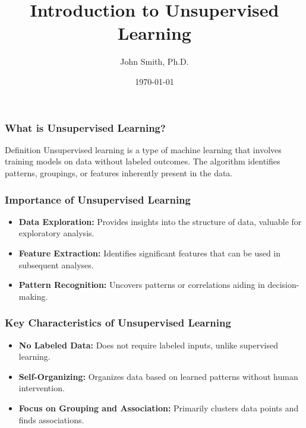 \documentclass[aspectratio=169]{beamer}
\begin{document}
\frame{\titlepage}

\begin{frame}[fragile]
    \title{Introduction to Unsupervised Learning}
    \author{John Smith, Ph.D.}
    \date{\today}
    \maketitle
\end{frame}

\begin{frame}[fragile]
    \frametitle{What is Unsupervised Learning?}
    \begin{block}{Definition}
        Unsupervised learning is a type of machine learning that involves training models on data without labeled outcomes. The algorithm identifies patterns, groupings, or features inherently present in the data.
    \end{block}
\end{frame}

\begin{frame}[fragile]
    \frametitle{Importance of Unsupervised Learning}
    \begin{itemize}
        \item \textbf{Data Exploration:} Provides insights into the structure of data, valuable for exploratory analysis.
        \item \textbf{Feature Extraction:} Identifies significant features that can be used in subsequent analyses.
        \item \textbf{Pattern Recognition:} Uncovers patterns or correlations aiding in decision-making.
    \end{itemize}
\end{frame}

\begin{frame}[fragile]
    \frametitle{Key Characteristics of Unsupervised Learning}
    \begin{itemize}
        \item \textbf{No Labeled Data:} Does not require labeled inputs, unlike supervised learning.
        \item \textbf{Self-Organizing:} Organizes data based on learned patterns without human intervention.
        \item \textbf{Focus on Grouping and Association:} Primarily clusters data points and finds associations.
    \end{itemize}
\end{frame}
\end{document}
